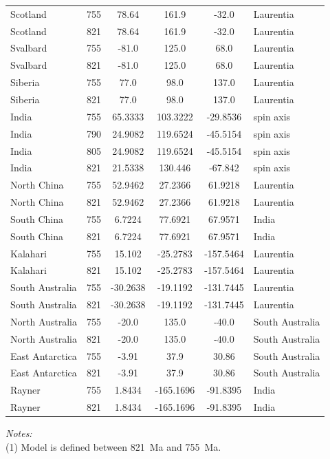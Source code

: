 \begin{table}[h!]
{\begin{tabular}{lccccl}
    Scotland & 755 & 78.64 & 161.9 & -32.0 & Laurentia \\
    Scotland & 821 & 78.64 & 161.9 & -32.0 & Laurentia \\
    Svalbard & 755 & -81.0 & 125.0 & 68.0 & Laurentia \\
    Svalbard & 821 & -81.0 & 125.0 & 68.0 & Laurentia \\
    Siberia & 755 & 77.0 & 98.0 & 137.0 & Laurentia \\
    Siberia & 821 & 77.0 & 98.0 & 137.0 & Laurentia \\
    India & 755 & 65.3333 & 103.3222 & -29.8536 & spin axis \\
    India & 790 & 24.9082 & 119.6524 & -45.5154 & spin axis \\
    India & 805 & 24.9082 & 119.6524 & -45.5154 & spin axis \\
    India & 821 & 21.5338 & 130.446 & -67.842 & spin axis \\
    North China & 755 & 52.9462 & 27.2366 & 61.9218 & Laurentia \\
    North China & 821 & 52.9462 & 27.2366 & 61.9218 & Laurentia \\
    South China & 755 & 6.7224 & 77.6921 & 67.9571 & India \\
    South China & 821 & 6.7224 & 77.6921 & 67.9571 & India \\
    Kalahari & 755 & 15.102 & -25.2783 & -157.5464 & Laurentia \\
    Kalahari & 821 & 15.102 & -25.2783 & -157.5464 & Laurentia \\
    South Australia & 755 & -30.2638 & -19.1192 & -131.7445 & Laurentia \\
    South Australia & 821 & -30.2638 & -19.1192 & -131.7445 & Laurentia \\
    North Australia & 755 & -20.0 & 135.0 & -40.0 & South Australia \\
    North Australia & 821 & -20.0 & 135.0 & -40.0 & South Australia \\
    East Antarctica & 755 & -3.91 & 37.9 & 30.86 & South Australia \\
    East Antarctica & 821 & -3.91 & 37.9 & 30.86 & South Australia \\
    Rayner & 755 & 1.8434 & -165.1696 & -91.8395 & India \\
    Rayner & 821 & 1.8434 & -165.1696 & -91.8395 & India \\
    \hline
    \end{tabular}}

\scriptsize
\flushleft \emph{Notes:} \\
(1) Model is defined between 821~Ma and 755~Ma.\\
\label{tab:Eulers}
\end{table}